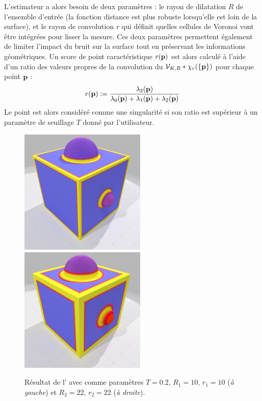 L'estimateur \VCM a alors besoin de deux paramètres : le rayon de dilatation $R$
de l'ensemble d'entrée (la fonction distance est plus robuste lorsqu'elle est
loin de la surface), et le rayon de convolution $r$ qui définit quelles cellules
de Voronoi vont être intégrées pour lisser la mesure. Ces deux paramètres
permettent également de limiter l'impact du bruit sur la surface tout en
préservant les informations géométriques. Un score de point caractéristique
$r(\mathbf{p})$ est alors calculé à l'aide d'un ratio des valeurs propres de la
convolution du \VCM $\mathcal{V}_{K,R} \ast \chi_r(\{\mathbf{p}\})$ pour chaque point
$\mathbf{p}$ :
%
\begin{equation}
  r(\mathbf{p}) := \frac{\lambda_2(\mathbf{p})}{\lambda_0(\mathbf{p}) + \lambda_1(\mathbf{p}) + \lambda_2(\mathbf{p})}
  \label{eq:VCM-ratio-eigenvalues}
\end{equation}
%
Le point est alors considéré comme une singularité si son ratio est supérieur à
un paramètre de seuillage $T$ donné par l'utilisateur.
%
\begin{figure}[ht]
  \centering
  \includegraphics[height=6cm]{images/Feature/CubeSphere_VCM_r_10}
  \includegraphics[height=6cm]{images/Feature/CubeSphere_VCM_r_22}
  \caption[Résultat de l']{Résultat de
  l' avec comme paramètres $T = 0.2$, $R_1 =
  10$, $r_1 = 10$ (\emph{à gauche}) et $R_2 = 22$, $r_2 = 22$ (\emph{à
  droite}).}\label{fig:VCM-cubesphere}
\end{figure}
%
